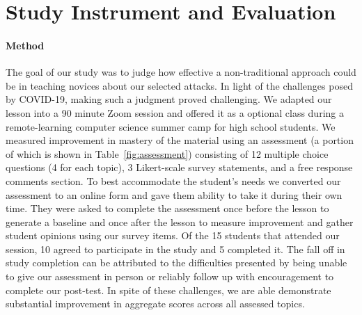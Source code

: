 \section{Study Instrument and Evaluation}
\label{SEC:evaluation}

\paragraph{Method}The goal of our study was to judge how effective a non-traditional approach
could be in teaching novices about our selected attacks.
In light of the challenges posed by COVID-19, making such a judgment
proved challenging.
We adapted our lesson into
a 90 minute Zoom session and offered it as a optional class during
a remote-learning computer science summer camp for high school
students.
We measured improvement in mastery
of the material
using
an  assessment (a portion of which is shown in Table~\ref{fig:assessment})
consisting of
12 multiple choice questions (4 for each topic),
3 Likert-scale survey statements,
and a free response comments section.
To best accommodate the student's needs we converted our
assessment to an online form and gave them ability to take it during
their own time.
They were asked to complete the assessment once before the lesson to
generate a baseline and once after the lesson to measure improvement
and gather student opinions using our survey items.
Of the 15 students that attended our session, 10 agreed to participate in
the study and 5 completed it.
The fall off in study completion can be attributed to the difficulties
presented by being unable to give our assessment in person or reliably
follow up with encouragement to complete our post-test.  In spite of these
challenges, we are able demonstrate substantial improvement in aggregate
scores across all assessed topics.







